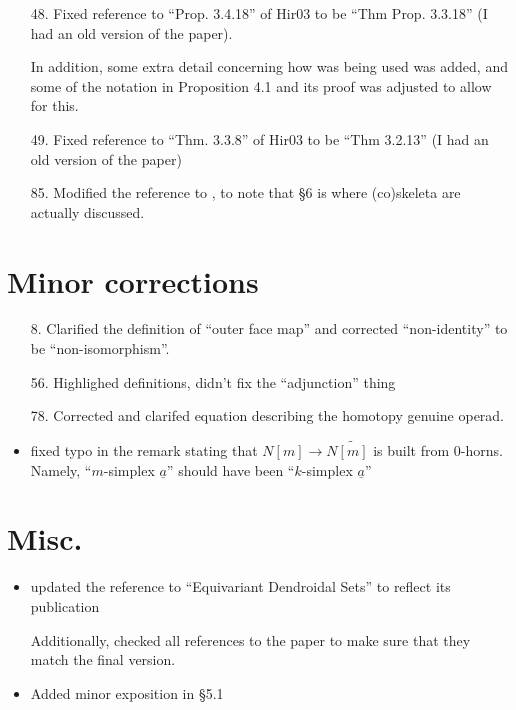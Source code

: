\documentclass{article}
\begin{document}
\begin{itemize}
\item[48.] Fixed reference to ``Prop. 3.4.18'' of Hir03 to be ``Thm Prop. 3.3.18'' (I had an old version of the paper).

In addition, some extra detail concerning how \cite[Prop. 3.3.18]{Hir03} was being used was added, and some of the notation in Proposition 4.1 and its proof was adjusted to allow for this.

\item[49.] Fixed reference to ``Thm. 3.3.8'' of Hir03 to be ``Thm 3.2.13'' (I had an old version of the paper)

\item[85.] Modified the reference \cite[\S 4]{BM11} to \cite[\S 4,\S 6]{BM11}, to note that \S 6 is where (co)skeleta are actually discussed. 
\end{itemize}



\section{Minor corrections}

\begin{itemize}
\item[8.] Clarified the definition of ``outer face map'' and corrected ``non-identity'' to be ``non-isomorphism''.
\item[56.] Highlighed definitions, didn't fix the ``adjunction'' thing
\item[78.] Corrected and clarifed equation describing the homotopy genuine operad.
\item fixed typo in the remark stating that $N[m] \to N \widetilde{[m]}$ is built from $0$-horns. Namely, ``$m$-simplex $\underline{a}$'' should have been ``$k$-simplex $\underline{a}$''
\end{itemize}

\section{Misc.}


\begin{itemize}
\item updated the reference to ``Equivariant Dendroidal Sets'' to reflect its publication

      Additionally, checked all references to the paper to make sure that they match the final version.
\item Added minor exposition in \S 5.1
\end{itemize}
\end{document}

